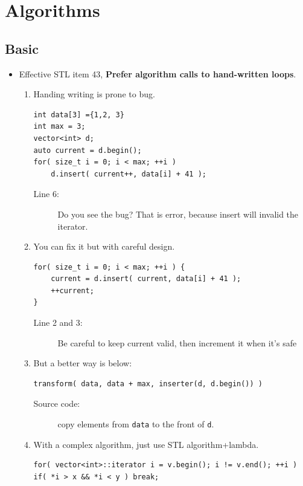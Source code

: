 \documentclass[a4paper,11pt,twoside]{book}
\begin{document}
\section{Algorithms}

\subsection{Basic}

\begin{itemize}

\item Effective STL item 43, \textbf{Prefer algorithm calls to hand-written loops}.
\begin{enumerate}
\item  Handing writing is prone to bug.

\begin{lstlisting}
int data[3] ={1,2, 3}
int max = 3;
vector<int> d;
auto current = d.begin();
for( size_t i = 0; i < max; ++i )
	d.insert( current++, data[i] + 41 ); 
\end{lstlisting}
\begin{description}
	\item[Line 6:] Do you see the bug? That is error, because insert will invalid the iterator.
\end{description}

\item You can fix it but with careful design.
\begin{lstlisting}
for( size_t i = 0; i < max; ++i ) {
	current = d.insert( current, data[i] + 41 ); 
	++current;    
}
\end{lstlisting}
\begin{description}
	\item[Line 2 and 3:] Be careful to keep current valid, then increment it when it's safe
\end{description}

\item But a better way is below:
\begin{lstlisting}[numbers=none]
transform( data, data + max, inserter(d, d.begin()) )
\end{lstlisting}
\begin{description}
	\item[Source code:] copy elements from \texttt{data} to the front of \texttt{d}.
\end{description}

\item With a complex algorithm, just use STL algorithm+lambda. 
\begin{lstlisting}[numbers=none]
for( vector<int>::iterator i = v.begin(); i != v.end(); ++i )
if( *i > x && *i < y ) break;


\end{lstlisting}
\end{enumerate}
\end{itemize}
\end{document}
